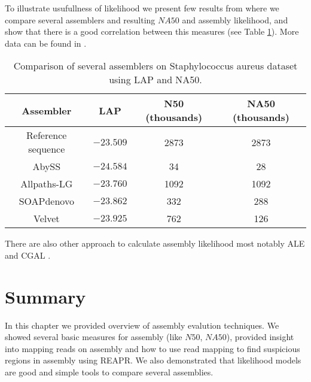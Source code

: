 To illustrate usufullness of likelihood we present
few results from \citet{Ghodsi2013} where we compare
several assemblers and resulting $NA50$ and assembly likelihood,
and show that there is a good correlation between this measures (see Table
\ref{tab:like}). More data can be found in \citet{Ghodsi2013}.

\begin{table}
\centering
\begin{tabular}{|c|c|c|c|}
\hline
Assembler & LAP & N50 (thousands) & NA50 (thousands) \\\hline
Reference sequence & $-23.509$ & 2873 & 2873 \\\hline
AbySS & $-24.584$ & 34 & 28 \\\hline
Allpaths-LG & $-23.760$ & 1092 & 1092 \\\hline
SOAPdenovo & $-23.862$ & 332 & 288 \\\hline
Velvet & $-23.925$ & 762 & 126  \\\hline
\end{tabular}
\caption{Comparison of several assemblers on Staphylococcus aureus dataset
using LAP and NA50.}
\label{tab:like}
\end{table}

There are also other approach to calculate assembly likelihood
most notably ALE and CGAL \citep{ALE, CGAL}.

\section{Summary}

In this chapter we provided overview of assembly evalution techniques.
We showed several basic measures for assembly (like $N50$, $NA50$),
provided insight into mapping reads on assembly and how to use
read mapping to find suspicious regions in assembly using REAPR.
We also demonstrated that likelihood models are good and simple
tools to compare several assemblies.

